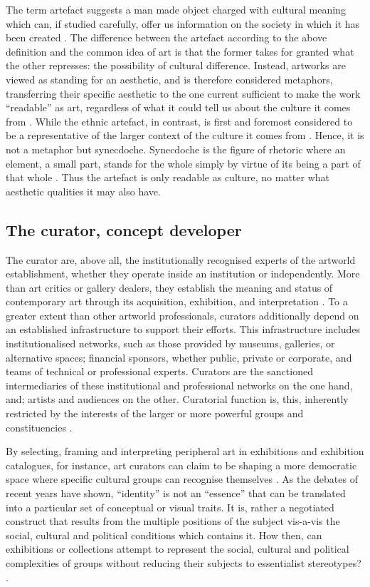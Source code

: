 The term artefact suggests a man made object charged with cultural meaning which can, if studied carefully, offer us information on the society in which it has been created \autocite[p. 205]{Thi_book}. The difference between the artefact according to the above definition and the common idea of art is that the former takes for granted what the other represses: the possibility of cultural difference. Instead, artworks are viewed as standing for an aesthetic, and is therefore considered metaphors, transferring their specific aesthetic to the one current sufficient to make the work “readable” as art, regardless of what it could tell us about the culture it comes from \autocite[p. 206]{Thi_book}. While the ethnic artefact, in contrast, is first and foremost considered to be a representative of the larger context of the culture it comes from \autocite[p. 206]{Thi_book}. Hence, it is not a metaphor but synecdoche. Synecdoche is the figure of rhetoric where an element, a small part, stands for the whole simply by virtue of its being a part of that whole \autocite[p. 206]{Thi_book}. Thus the artefact is only readable as culture, no matter what aesthetic qualities it may also have.


\subsection{The curator, concept developer}
The curator are, above all, the institutionally recognised experts of the artworld establishment, whether they operate inside an institution or independently. More than art critics or gallery dealers, they establish the meaning and status of contemporary art through its acquisition, exhibition, and interpretation \autocite[p. 22]{Thi_book}. To a greater extent than other artworld professionals, curators additionally depend on an established infrastructure to support their efforts. This infrastructure includes institutionalised networks, such as those provided by museums, galleries, or alternative spaces; financial sponsors, whether public, private or corporate, and teams of technical or professional experts. Curators are the sanctioned intermediaries of these institutional and professional networks on the one hand, and; artists and audiences on the other. Curatorial function is, this, inherently restricted by the interests of the larger or more powerful groups and constituencies \autocite[p. 22]{Thi_book}.

By selecting, framing and interpreting peripheral art in exhibitions and exhibition catalogues, for instance, art curators can claim to be shaping a more democratic space where specific cultural groups can recognise themselves \autocite[p. 23]{Thi_book}. As the debates of recent years have shown, “identity” is not an “essence” that can be translated into a particular set of conceptual or visual traits. It is, rather a negotiated construct that results from the multiple positions of the subject vis-a-vis the social, cultural and political conditions which contains it. How then, can exhibitions or collections attempt to represent the social, cultural and political complexities of groups without reducing their subjects to essentialist stereotypes? \autocite[p. 23]{Thi_book}.

